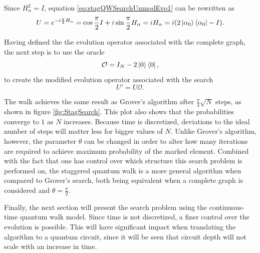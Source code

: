 \documentclass[../../dissertation.tex]{subfiles}
\begin{document}
Since $H_\alpha^2 = I$, equation \ref{eq:stagQWSearchUnmodEvo1} can be
rewritten as
\begin{equation}
	U = e^{-i\frac{\pi}{2} H_\alpha} = \cos{\frac{\pi}{2}I} + i\sin{\frac{\pi}{2}H_\alpha} = i H_\alpha = i(2\ket{\alpha_0}\bra{\alpha_0} - I).
\end{equation}\par
Having defined the the evolution operator associated with the complete graph,
the next step is to use the oracle
\begin{equation}
	\mathcal{O} = I_N - 2\ket{0}\bra{0},
\end{equation}
to create the modified evolution operator associated with the search
\begin{equation}
	U' = U\mathcal{O}.
	\label{eq:stagSearchSimulModEvoOp}
\end{equation}\par
The walk achieves the same result as Grover's algorithm after
$\frac{\pi}{4}\sqrt{N}$ steps, as shown in figure \ref{fig:StagSearch}. This
plot also shows that the probabilities converge to $1$ as $N$ increases.
Because time is discretized, deviations to the ideal number of steps will
matter less for bigger values of $N$.
Unlike Grover's algorithm, however, the parameter $\theta$ can be changed in
order to alter how many iterations are required to achieve maximum probability
of the marked element. Combined with the fact that one has control over which
structure this search problem is performed on, the staggered quantum walk is a
more general algorithm when compared to Grover's search, both being equivalent
when a complete graph is considered and $\theta = \frac{\pi}{2}$.\par
Finally, the next section will present the search problem using the
continuous-time quantum walk model. Since time is not discretized, a finer
control over the evolution is possible. This will have significant impact when
translating the algorithm to a quantum circuit, since it will be seen that
circuit depth will not scale with an increase in time. 
\end{document}
